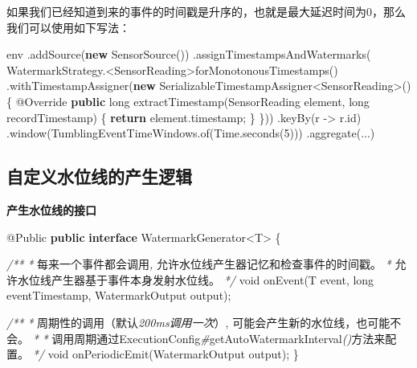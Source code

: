 \documentclass[cn,11pt,chinese]{elegantbook}
\newenvironment{Shaded}{}{}
\newcommand{\AttributeTok}[1]{\textcolor[rgb]{0.49,0.56,0.16}{#1}}
\newcommand{\BuiltInTok}[1]{#1}
\newcommand{\CommentTok}[1]{\textcolor[rgb]{0.38,0.63,0.69}{\textit{#1}}}
\newcommand{\DataTypeTok}[1]{\textcolor[rgb]{0.56,0.13,0.00}{#1}}
\newcommand{\DecValTok}[1]{\textcolor[rgb]{0.25,0.63,0.44}{#1}}
\newcommand{\FunctionTok}[1]{\textcolor[rgb]{0.02,0.16,0.49}{#1}}
\newcommand{\KeywordTok}[1]{\textcolor[rgb]{0.00,0.44,0.13}{\textbf{#1}}}
\newcommand{\NormalTok}[1]{#1}
\begin{document}
如果我们已经知道到来的事件的时间戳是升序的，也就是最大延迟时间为0，那么我们可以使用如下写法：

\begin{Shaded}
\begin{Highlighting}[]
\NormalTok{env}
\NormalTok{  .}\FunctionTok{addSource}\NormalTok{(}\KeywordTok{new} \FunctionTok{SensorSource}\NormalTok{())}
\NormalTok{  .}\FunctionTok{assignTimestampsAndWatermarks}\NormalTok{(}
\NormalTok{    WatermarkStrategy.\textless{}SensorReading\textgreater{}}\FunctionTok{forMonotonousTimestamps}\NormalTok{()}
\NormalTok{      .}\FunctionTok{withTimestampAssigner}\NormalTok{(}\KeywordTok{new}\NormalTok{ SerializableTimestampAssigner\textless{}SensorReading\textgreater{}() \{}
        \AttributeTok{@Override}
        \KeywordTok{public} \DataTypeTok{long} \FunctionTok{extractTimestamp}\NormalTok{(SensorReading element, }\DataTypeTok{long}\NormalTok{ recordTimestamp) \{}
          \KeywordTok{return}\NormalTok{ element.}\FunctionTok{timestamp}\NormalTok{;}
\NormalTok{        \}}
\NormalTok{    \}))}
\NormalTok{    .}\FunctionTok{keyBy}\NormalTok{(r {-}\textgreater{} r.}\FunctionTok{id}\NormalTok{)}
\NormalTok{    .}\FunctionTok{window}\NormalTok{(TumblingEventTimeWindows.}\FunctionTok{of}\NormalTok{(}\BuiltInTok{Time}\NormalTok{.}\FunctionTok{seconds}\NormalTok{(}\DecValTok{5}\NormalTok{)))}
\NormalTok{    .}\FunctionTok{aggregate}\NormalTok{(...)}
\end{Highlighting}
\end{Shaded}

\hypertarget{ux81eaux5b9aux4e49ux6c34ux4f4dux7ebfux7684ux4ea7ux751fux903bux8f91}{%
\subsection{自定义水位线的产生逻辑}\label{ux81eaux5b9aux4e49ux6c34ux4f4dux7ebfux7684ux4ea7ux751fux903bux8f91}}

\textbf{产生水位线的接口}

\begin{Shaded}
\begin{Highlighting}[]
\AttributeTok{@Public}
\KeywordTok{public} \KeywordTok{interface}\NormalTok{ WatermarkGenerator\textless{}T\textgreater{} \{}

    \CommentTok{/**}
     \CommentTok{*}\NormalTok{ 每来一个事件都会调用}\CommentTok{,}\NormalTok{ 允许水位线产生器记忆和检查事件的时间戳。}
     \CommentTok{*}\NormalTok{ 允许水位线产生器基于事件本身发射水位线。}
     \CommentTok{*/}
    \DataTypeTok{void} \FunctionTok{onEvent}\NormalTok{(T event, }\DataTypeTok{long}\NormalTok{ eventTimestamp, WatermarkOutput output);}

    \CommentTok{/**}
     \CommentTok{*}\NormalTok{ 周期性的调用（默认}\CommentTok{200ms调用一次}\NormalTok{）, 可能会产生新的水位线，也可能不会。}
     \CommentTok{*}
     \CommentTok{*}\NormalTok{ 调用周期通过ExecutionConfig}\CommentTok{\#}\NormalTok{getAutoWatermarkInterval}\CommentTok{()}\NormalTok{方法来配置。}
     \CommentTok{*/}
    \DataTypeTok{void} \FunctionTok{onPeriodicEmit}\NormalTok{(WatermarkOutput output);}
\NormalTok{\}}
\end{Highlighting}
\end{Shaded}
\end{document}
